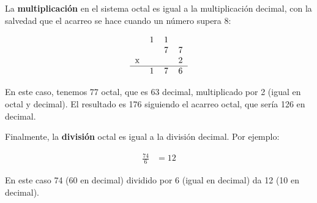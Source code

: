 La \textbf{multiplicación} en el sistema octal es igual a la multiplicación decimal, con la salvedad que el acarreo se hace cuando un número supera 8:

\begin{align*}
\begin{tabular}{cccc}
	  & 1 & 1 &   \\
	  &   & 7 & 7 \\
	x &   &   & 2 \\
\hline
	  & 1 & 7 & 6 \\
\end{tabular}
\end{align*}

En este caso, tenemos 77 octal, que es 63 decimal, multiplicado por 2 (igual en octal y decimal). El resultado es 176 siguiendo el acarreo octal, que sería 126 en decimal.

Finalmente, la \textbf{división} octal es igual a la división decimal. Por ejemplo:

\begin{align*}
	\frac{74}{6} &= 12
\end{align*}

En este caso 74 (60 en decimal) dividido por 6 (igual en decimal) da 12 (10 en decimal).
